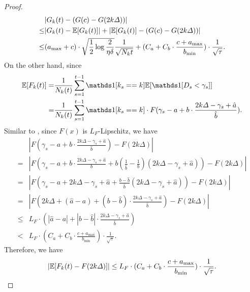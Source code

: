 \begin{proof}
    \begin{equation}
        \label{eq:hoeffding_g_k}
        \begin{aligned}
            &|G_k(t)-(G(c)-G(2k\Delta))|\\
            \leq&|G_k(t)-\mathbb{E}[G_k(t)]| + |\mathbb{E}[G_k(t)]-(G(c)-G(2k\Delta))|\\
            \leq&(a_{\max}+c)\cdot\sqrt{\frac12\log\frac2{\eta\delta}}\frac1{\sqrt{N_k{t}}} + (C_a+C_b\cdot\frac{c+a_{\max}}{b_{\min}})\cdot\frac1{\sqrt{\tau}}.
        \end{aligned}
    \end{equation}
    On the other hand, since
    \begin{equation}
        \label{eq:expectation_f_k}
        \begin{aligned}
            \E[F_k(t)]=&\frac1{N_k(t)}\sum_{s=1}^{t-1}\ind[k_s==k]\E[\ind[D_s<\gamma_s]]\\
            =&\frac1{N_k(t)}\sum_{s=1}^{t-1}\ind[k_s==k]\cdot F(\gamma_s-a+b\cdot\frac{2k\Delta-\gamma_s+\hat a}{\hat b}).
        \end{aligned}
    \end{equation}
    Similar to , since $F(x)$ is $L_F$-Lipschitz, we have
    \begin{equation}
        \label{eq:f_k_estimation_error}
        \begin{aligned}
            &|F(\gamma_s-a+b\cdot\frac{2k\Delta-\gamma_s+\hat a}{\hat b}) - F(2k\Delta)|\\
            =&|F(\gamma_s-a+b\cdot\frac{2k\Delta-\gamma_s+\hat a}b + b(\frac1{\hat b}-\frac1b)(2k\Delta-\gamma_s+\hat a))-F(2k\Delta)|\\
            =&|F(\gamma_s-a+2k\Delta-\gamma_s+\hat a+\frac{b-\hat b}{\hat b}(2k\Delta-\gamma_s+\hat a))-F(2k\Delta)|\\
            =&|F(2k\Delta+(\hat a-a) + (b-\hat b)\cdot\frac{2k\Delta-\gamma_s+\hat a}{\hat b})-F(2k\Delta)|\\
            \leq&L_F\cdot(|\hat a - a| + |b - \hat b|\cdot\frac{2k\Delta-\gamma_s+\hat a}{\hat b})\\
            <&L_F\cdot(C_a + C_b\cdot\frac{c+a_{\max}}{b_{\min}})\cdot\frac1{\sqrt{\tau}}.
        \end{aligned}
    \end{equation}
    Therefore, we have
    \begin{equation}
        \label{eq:f_k_bias}
        \begin{aligned}
            |\mathbb{E}[F_k(t)-F(2k\Delta)]|\leq L_F\cdot(C_a + C_b\cdot\frac{c+a_{\max}}{b_{\min}})\cdot\frac1{\sqrt{\tau}}.
        \end{aligned}
    \end{equation}


\end{proof}
